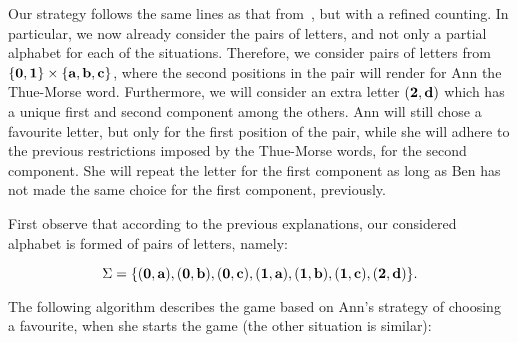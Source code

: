 \documentclass[runningheads,fleqn]{llncs}
\begin{document}
Our strategy follows the same lines as that from~\cite{GryKosZma15}, but with a refined counting. In particular, we now already consider the pairs of letters, and not only a partial alphabet for each of the situations. Therefore, we consider pairs of letters from $\{\textbf 0,\textbf 1\} \times \{\textbf a,\textbf b,\textbf c\}$, where the second positions in the pair will render for Ann the Thue-Morse word. Furthermore, we will consider an extra letter $(\textbf 2,\textbf d)$ which has a unique first and second component among the others.
Ann will still chose a favourite letter, but only for the first position of the pair, while she will adhere to the previous restrictions imposed by the Thue-Morse words, for the second component. She will repeat the letter for the first component as long as Ben has not made the same choice for the first component, previously.

First observe that according to the previous explanations, our considered alphabet is formed of pairs of letters, namely:

$$\Sigma = \{(\textbf 0,\textbf a), (\textbf 0,\textbf b), (\textbf 0,\textbf c), (\textbf 1,\textbf a), (\textbf 1,\textbf b), (\textbf 1,\textbf c), (\textbf 2,\textbf d)\}.$$

The following algorithm describes the game based on Ann's  strategy of choosing a favourite, when she starts the game (the other situation is similar):
\end{document}
